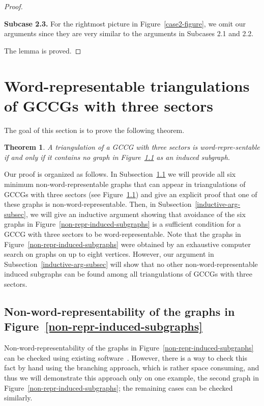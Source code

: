 \documentclass[12pt]{article}
\newtheorem{thm}{Theorem}[section]
\numberwithin{equation}{section}
\begin{document}
\begin{proof}
\begin{itemize}
 {\bf Subcase 2.3.} For the rightmost picture in Figure~\ref{case2-figure}, we omit our arguments since they are very  similar to the arguments in Subcases 2.1 and 2.2.
 
\end{itemize}
The  lemma is proved.
\end{proof}

\section{Word-representable triangulations of GCCGs with three sectors}\label{sec4}

The goal of this section is to prove the following theorem.

\begin{thm}\label{thm-3} A triangulation of a GCCG with three sectors is word-repre-sentable if and only if it contains no graph in Figure~{\em \ref{non-representabiliy-of-6-graphs}} as an induced subgraph.\end{thm}

Our proof is organized as follows. In Subsection~\ref{non-representabiliy-of-6-graphs} we will provide all six minimum non-word-representable graphs that can appear in triangulations of GCCGs with three sectors (see Figure~\ref{non-representabiliy-of-6-graphs}) and give an explicit proof that one of these graphs is non-word-representable. Then, in Subsection~\ref{inductive-arg-subsec}, we will give an inductive argument showing that avoidance of the six graphs in Figure~\ref{non-repr-induced-subgraphs} is a sufficient condition for a GCCG with three sectors to be word-representable.  Note that the graphs in Figure~\ref{non-repr-induced-subgraphs}  were obtained by an exhaustive computer search on graphs on up to eight vertices. However, our argument in Subsection~\ref{inductive-arg-subsec} will show that no other non-word-representable induced subgraphs can be found among all triangulations of GCCGs with three sectors.

\subsection{Non-word-representability of the graphs in Figure~\ref{non-repr-induced-subgraphs}}\label{non-representabiliy-of-6-graphs}

Non-word-representability of the graphs in Figure~\ref{non-repr-induced-subgraphs} can be checked using existing software~\cite{Glen}. However, there is a way to check this fact by hand using the branching approach, which is rather space consuming, and thus we will demonstrate this approach only on one example, the second graph in Figure~\ref{non-repr-induced-subgraphs}; the remaining cases can be checked similarly.
\end{document}
